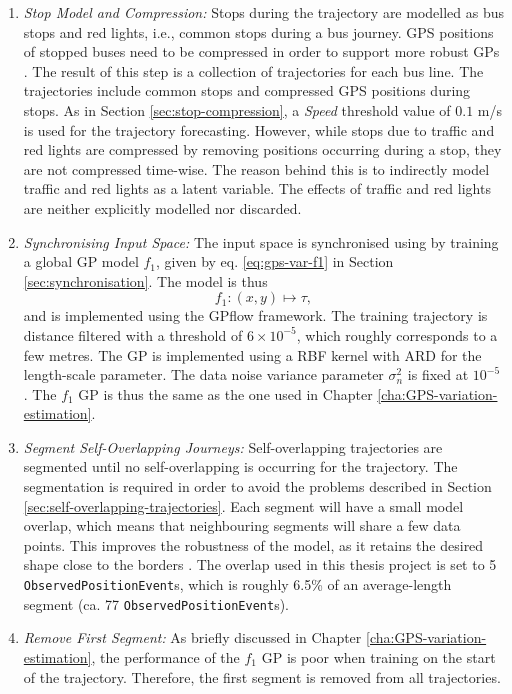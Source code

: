 \begin{enumerate}
    \item \textit{Stop Model and Compression:}
    Stops during the trajectory are modelled as bus stops and red lights, i.e., common stops during a bus journey.
    GPS positions of stopped buses need to be compressed in order to support more robust GPs \cite{Tiger2018-gp-motion-pattern}.
    The result of this step is a collection of trajectories for each bus line.
    The trajectories include common stops and compressed GPS positions during stops.
    As in Section \ref{sec:stop-compression}, a \textit{Speed} threshold value of $0.1$ m/s is used for the trajectory forecasting.
    However, while stops due to traffic and red lights are compressed by removing positions occurring during a stop, they are not compressed time-wise.
    The reason behind this is to indirectly model traffic and red lights as a latent variable.
    The effects of traffic and red lights are neither explicitly modelled nor discarded.

    \item \textit{Synchronising Input Space:}
    The input space is synchronised using by training a global GP model $f_1$, given by eq. \ref{eq:gps-var-f1} in Section \ref{sec:synchronisation}.
    The model is thus
    \begin{equation} \label{eq:gps-var-f1}
        f_1: (x, y) \longmapsto \tau,
    \end{equation}
    and is implemented using the GPflow \cite{GPflow2017} framework.
    The training trajectory is distance filtered with a threshold of $6 \times 10^{-5}$, which roughly corresponds to a few metres.
    The GP is implemented using a RBF kernel with ARD for the length-scale parameter.
    The data noise variance parameter $\sigma^2_n$ is fixed at $10^{-5}$.
    The $f_1$ GP is thus the same as the one used in Chapter \ref{cha:GPS-variation-estimation}.

    \item \textit{Segment Self-Overlapping Journeys:}
    Self-overlapping trajectories are segmented until no self-overlapping is occurring for the trajectory.
    The segmentation is required in order to avoid the problems described in Section \ref{sec:self-overlapping-trajectories}.
    Each segment will have a small model overlap, which means that neighbouring segments will share a few data points.
    This improves the robustness of the model, as it retains the desired shape close to the borders \cite{Tiger2018-gp-motion-pattern}.
    The overlap used in this thesis project is set to 5 \texttt{ObservedPositionEvent}s, which is roughly 6.5\% of an average-length segment (ca. 77 \texttt{ObservedPositionEvent}s).

    \item \textit{Remove First Segment:}
    As briefly discussed in Chapter \ref{cha:GPS-variation-estimation}, the performance of the $f_1$ GP is poor when training on the start of the trajectory.
    Therefore, the first segment is removed from all trajectories.

\end{enumerate}


